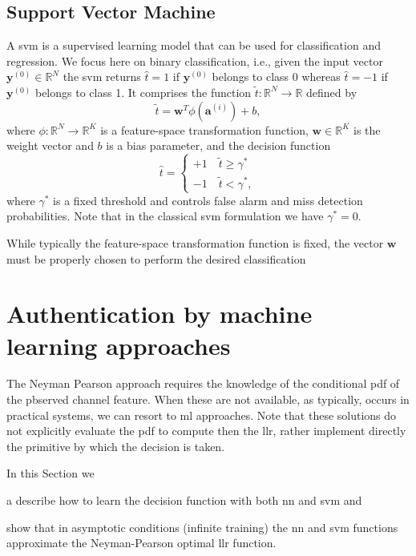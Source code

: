 \documentclass[draftcls,onecolumn,12pt]{IEEEtran}
\newcommand{\ie}{i.e., }
\begin{document}
\subsection{Support Vector Machine}\label{sec:svm}
A \ac{svm} \cite{Bishop2006} is a supervised learning model that can be used for classification and regression. We focus here on binary classification, \ie given the input vector $\bm{y}^{(0)} \in \mathbb{R}^N$ the \ac{svm} returns $\hat{t} = 1$ if $\bm{y}^{(0)}$ belongs to class 0 whereas $\hat{t}=-1$ if $\bm{y}^{(0)}$ belongs to class 1. It comprises the function $\tilde{t}: \mathbb{R}^N \to \mathbb{R}$ defined by
\begin{equation}
\label{eq:svm}
\tilde{t} = \mathbf{w}^T \phi (\mathbf{a}^{(i)}) + b,
\end{equation}
where $\phi: \mathbb{R}^N \to \mathbb{R}^K$ is a feature-space transformation function, $\mathbf{w} \in \mathbb{R}^K$ is the weight vector and $b$ is a bias parameter, and the decision function
\begin{equation}
\label{eq:cases}
\hat{t} = 
\begin{cases}
+1 \quad \tilde{t}  \geq \gamma^* \\
-1 \quad \tilde{t}  < \gamma^*,
\end{cases}		
\end{equation} 
where $\gamma^*$ is a fixed threshold and controls false alarm and miss detection probabilities. Note that in the classical \ac{svm} formulation we have $\gamma^* = 0$.

While typically the feature-space transformation function is fixed, the vector $\mathbf{w}$ must be properly chosen to perform the desired classification
\section{Authentication by machine learning approaches}
The Neyman Pearson approach requires the knowledge of the conditional \ac{pdf} of the pbserved channel feature. When these are not available, as typically, occurs in practical systems, we can resort to \ac{ml} approaches. Note that these solutions do not explicitly evaluate the \ac{pdf} to compute then the \ac{llr}, rather implement directly the primitive by which the decision is taken.

In this Section we \begin{enumerate*}[label=\alph*)]
\item a describe how to learn the decision function with both \ac{nn} and \ac{svm} and \item show that in asymptotic conditions (infinite training) the \ac{nn} and \ac{svm} functions approximate the Neyman-Pearson optimal \ac{llr} function.
\end{enumerate*}
\end{document}
